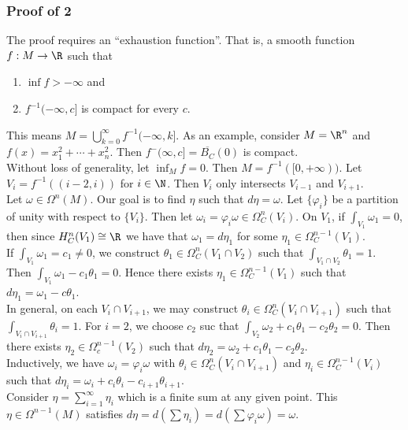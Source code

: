 \documentclass[11pt]{article}
\begin{document}
\subsubsection*{Proof of 2}
\label{sec:org189454b}
The proof requires an ``exhaustion function''. That is, a smooth function \(f:M\to\R\) such that\\
\begin{enumerate}
\item \(\inf f>-\infty\) and\\
\item \(f^{-1}(-\infty,c]\) is compact for every \(c\).\\
\end{enumerate}

This means \(M=\bigcup_{k=0}^{\infty}f^{-1}(-\infty,k]\). As an example, consider \(M=\R^{n}\) and \(f(x)=x_{1}^{2}+\cdots+x_{n}^{2}\). Then \(f^{-}(\infty,c]=\overline{B_{C}}(0)\) is compact.\\
Without loss of generality, let \(\inf_{M}f=0\). Then \(M=f^{-1}([0,+\infty))\). Let \(V_{i}=f^{-1}((i-2,i))\) for \(i\in\N\). Then \(V_{i}\) only intersects \(V_{i-1}\) and \(V_{i+1}\).\\
Let \(\omega\in\Omega^{n}(M)\). Our goal is to find \(\eta\) such that \(d\eta=\omega\). Let \(\{\varphi_{i}\}\) be a partition of unity with respect to \(\{V_{i}\}\). Then let \(\omega_{i}=\varphi_{i}\omega\in\Omega_{C}^{n}(V_{i})\). On \(V_{1}\), if \(\int_{V_{1}}\omega_{1}=0\), then since \(H_{C}^{n}(V_{1})\cong\R\) we have that \(\omega_{1}=d\eta_{1}\) for some \(\eta_{1}\in\Omega_{C}^{n-1}(V_{1})\).\\
If \(\int_{V_{1}}\omega_{1}=c_{1}\neq0\), we construct \(\theta_{1}\in\Omega_{C}^{n}(V_{1}\cap V_{2})\) such that \(\int_{V_{1}\cap V_{2}}\theta_{1}=1\). Then \(\int_{V_{1}}\omega_{1}-c_{1}\theta_{1}=0\). Hence there exists \(\eta_{1}\in\Omega_{C}^{n-1}(V_{1})\) such that \(d\eta_{1}=\omega_{1}-c\theta_{1}\).\\
In general, on each \(V_{i}\cap V_{i+1}\), we may construct \(\theta_{i}\in\Omega_{C}^{n}(V_{i}\cap V_{i+1})\) such that \(\int_{V_{i}\cap V_{i+1}}\theta_{i}=1\). For \(i=2\), we choose \(c_{2}\) suc that \(\int_{V_{2}}\omega_{2}+c_{1}\theta_{1}-c_{2}\theta_{2}=0\). Then there exists \(\eta_{2}\in\Omega_{c}^{n-1}(V_{2})\) such that \(d\eta_{2}=\omega_{2}+c_{1}\theta_{1}-c_{2}\theta_{2}\).\\
Inductively, we have \(\omega_{i}=\varphi_{i}\omega\) with \(\theta_{i}\in\Omega_{C}^{n}(V_{i}\cap V_{i+1})\) and \(\eta_{i}\in\Omega_{C}^{n-1}(V_{i})\) such that \(d\eta_{i}=\omega_{i}+c_{i}\theta_{i}-c_{i+1}\theta_{i+1}\).\\
Consider \(\eta=\sum_{i=1}^{\infty}\eta_{i}\) which is a finite sum at any given point. This \(\eta\in\Omega^{n-1}(M)\) satisfies \(d\eta=d\left( \sum\eta_{i} \right)=d\left( \sum\varphi_{i}\omega \right)=\omega\).\\
\end{document}
